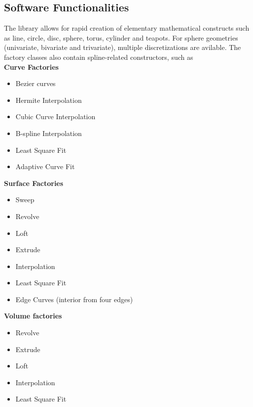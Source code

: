 \documentclass[preprint,12pt, a4paper]{elsarticle}
\begin{document}
\subsection{Software Functionalities}
\label{}

The library allows for rapid creation of elementary mathematical constructs such as line, circle, disc, sphere, torus, cylinder and teapots.
For sphere geometries (univariate, bivariate and trivariate), multiple discretizations are avilable.
The factory classes also contain spline-related constructors, such as \\
\textbf{Curve Factories}
\begin{itemize}
    \setlength\itemsep{-.5em}
    \item Bezier curves
    \item Hermite Interpolation
    \item Cubic Curve Interpolation
    \item B-spline Interpolation
    \item Least Square Fit
    \item Adaptive Curve Fit
\end{itemize}
\textbf{Surface Factories}
\begin{itemize}
    \setlength\itemsep{-.5em}
    \item Sweep
    \item Revolve
    \item Loft
    \item Extrude
    \item Interpolation
    \item Least Square Fit
    \item Edge Curves (interior from four edges)
\end{itemize}
\textbf{Volume factories}
\begin{itemize}
    \setlength\itemsep{-.5em}
    \item Revolve
    \item Extrude
    \item Loft
    \item Interpolation
    \item Least Square Fit
\end{itemize}
\end{document}
